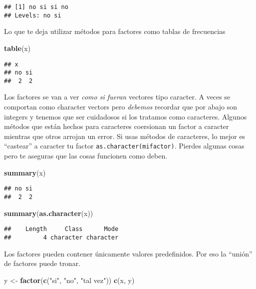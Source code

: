 \documentclass[]{article}
\newenvironment{Shaded}{\begin{snugshade}}{\end{snugshade}}
\newcommand{\KeywordTok}[1]{\textcolor[rgb]{0.13,0.29,0.53}{\textbf{{#1}}}}
\newcommand{\StringTok}[1]{\textcolor[rgb]{0.31,0.60,0.02}{{#1}}}
\newcommand{\NormalTok}[1]{{#1}}
\begin{document}
\begin{verbatim}
## [1] no si si no
## Levels: no si
\end{verbatim}

Lo que te deja utilizar métodos para factores como tablas de frecuencias

\begin{Shaded}
\begin{Highlighting}[]
\KeywordTok{table}\NormalTok{(x)}
\end{Highlighting}
\end{Shaded}

\begin{verbatim}
## x
## no si 
##  2  2
\end{verbatim}

Los factores se van a ver \emph{como si fueran} vectores tipo caracter.
A veces se comportan como character vectors pero \emph{debemos} recordar
que por abajo son integers y tenemos que ser cuidadosos si los tratamos
como caracteres. Algunos métodos que están hechos para caracteres
coersionan un factor a caracter mientras que otros arrojan un error. Si
usas métodos de caracteres, lo mejor es ``castear'' a caracter tu factor
\texttt{as.character(mifactor)}. Pierdes algunas cosas pero te aseguras
que las cosas funcionen como deben.

\begin{Shaded}
\begin{Highlighting}[]
\KeywordTok{summary}\NormalTok{(x)}
\end{Highlighting}
\end{Shaded}

\begin{verbatim}
## no si 
##  2  2
\end{verbatim}

\begin{Shaded}
\begin{Highlighting}[]
\KeywordTok{summary}\NormalTok{(}\KeywordTok{as.character}\NormalTok{(x))}
\end{Highlighting}
\end{Shaded}

\begin{verbatim}
##    Length     Class      Mode 
##         4 character character
\end{verbatim}

Los factores pueden contener únicamente valores predefinidos. Por eso la
``unión'' de factores puede tronar.

\begin{Shaded}
\begin{Highlighting}[]
\NormalTok{y <-}\StringTok{ }\KeywordTok{factor}\NormalTok{(}\KeywordTok{c}\NormalTok{(}\StringTok{"si"}\NormalTok{, }\StringTok{"no"}\NormalTok{, }\StringTok{"tal vez"}\NormalTok{))}
\KeywordTok{c}\NormalTok{(x, y)}
\end{Highlighting}
\end{Shaded}
\end{document}
